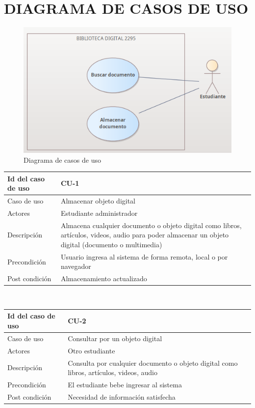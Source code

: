 \chapter*{DIAGRAMA DE CASOS DE USO}
\begin{figure}[ht]
	\centering
	\includegraphics[scale=0.8]{images/casoUso1}
	\caption{Diagrama de casos de uso}
\end{figure}
\begin{center}
\begin{tabular}{lp{10cm}}
    Id del caso de uso & CU-1 \\
    \hline
    Caso de uso & Almacenar objeto digital \\
    Actores & Estudiante administrador \\
    Descripción & Almacena cualquier documento o objeto digital como libros, artículos, videos, audio para poder almacenar un objeto digital (documento o multimedia)  \\
    Precondición & Usuario ingresa al sistema de forma remota, local o por navegador \\
    Post condición & Almacenamiento actualizado \\
\end{tabular}\\
\vspace{0.5cm}
\begin{tabular}{lp{10cm}}
    Id del caso de uso & CU-2 \\
    \hline
    Caso de uso & Consultar por un objeto digital \\
    Actores & Otro estudiante \\
    Descripción & Consulta por cualquier documento o objeto digital como libros, artículos, videos, audio  \\
    Precondición & El estudiante bebe ingresar al sistema\\
    Post condición & Necesidad de información satisfecha \\
\end{tabular}
\end{center}

